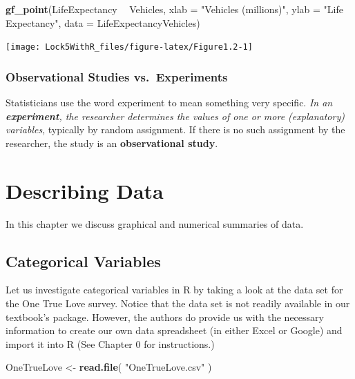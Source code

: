 \documentclass[]{book}
\newenvironment{Shaded}{\begin{snugshade}}{\end{snugshade}}
\newcommand{\DataTypeTok}[1]{\textcolor[rgb]{0.13,0.29,0.53}{#1}}
\newcommand{\KeywordTok}[1]{\textcolor[rgb]{0.13,0.29,0.53}{\textbf{#1}}}
\newcommand{\NormalTok}[1]{#1}
\newcommand{\OperatorTok}[1]{\textcolor[rgb]{0.81,0.36,0.00}{\textbf{#1}}}
\newcommand{\StringTok}[1]{\textcolor[rgb]{0.31,0.60,0.02}{#1}}
\begin{document}
\begin{Shaded}
\begin{Highlighting}[]
\KeywordTok{gf_point}\NormalTok{(LifeExpectancy }\OperatorTok{~}\StringTok{ }\NormalTok{Vehicles, }\DataTypeTok{xlab =} \StringTok{"Vehicles (millions)"}\NormalTok{, }\DataTypeTok{ylab =} \StringTok{"Life Expectancy"}\NormalTok{, }
       \DataTypeTok{data =}\NormalTok{ LifeExpectancyVehicles)}
\end{Highlighting}
\end{Shaded}

\texttt{[image: Lock5WithR\_files/figure-latex/Figure1.2-1]}

\hypertarget{observational-studies-vs.-experiments}{%
\subsection{Observational Studies vs.~Experiments}\label{observational-studies-vs.-experiments}}

Statisticians use the word experiment to mean something very specific. \emph{In an \textbf{experiment}, the researcher determines the values of one or more (explanatory) variables}, typically by random assignment. If there is no such assignment by the researcher, the study is an \textbf{observational study}.

\hypertarget{describing-data}{%
\chapter{Describing Data}\label{describing-data}}

In this chapter we discuss graphical and numerical summaries of data.

\hypertarget{categorical-variables}{%
\section{Categorical Variables}\label{categorical-variables}}

Let us investigate categorical variables in R by taking a look at the data set for the One True Love survey. Notice that the data set is not readily available in our textbook's package. However, the authors do provide us with the necessary information to create our own data spreadsheet (in either Excel or Google) and import it into R (See Chapter 0 for instructions.)

\begin{Shaded}
\begin{Highlighting}[]
\NormalTok{OneTrueLove <-}\StringTok{ }\KeywordTok{read.file}\NormalTok{( }\StringTok{"OneTrueLove.csv"}\NormalTok{ )}
\end{Highlighting}
\end{Shaded}
\end{document}
